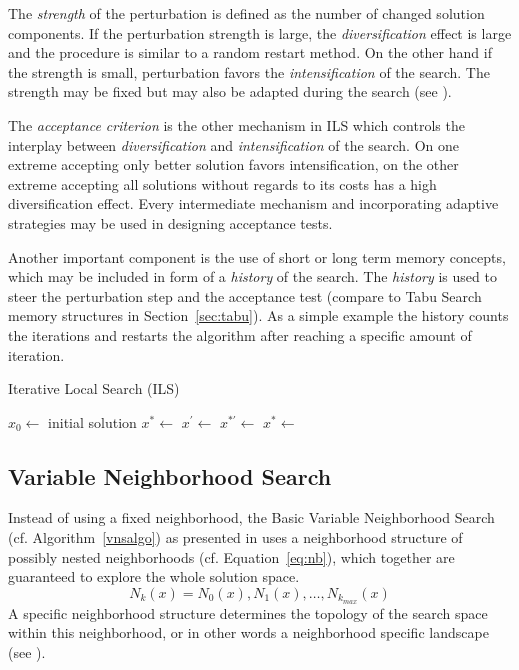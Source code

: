 The \emph{strength} of the perturbation is defined as the number of changed solution components. 
If the perturbation strength is large, the \emph{diversification} effect is large and the procedure is similar to a random restart method. On the other hand if the strength is small, perturbation favors the \emph{intensification} of the search. The strength may be fixed but may also be adapted during the search (see \cite{lourencco2001iterated}).

The \emph{acceptance criterion} is the other mechanism in ILS which controls the interplay between \emph{diversification} and \emph{intensification} of the search. 
On one extreme accepting only better solution favors intensification, on the other extreme accepting all solutions without regards to its costs has a high diversification effect. Every intermediate mechanism and incorporating adaptive strategies may be used in designing acceptance tests.  

Another important component is the use of short or long term memory concepts, which may be included in form of a \emph{history} of the search. The \emph{history} is used to steer the perturbation step and the acceptance test (compare to Tabu Search memory structures in Section~\ref{sec:tabu}). As a simple example the history counts the iterations and restarts the algorithm after reaching a specific amount of iteration.
 
\begin{algorithm}
\caption{Iterative Local Search (ILS)}
\label{ilsalgo}
\begin{algorithmic}[1]
\State $x_0\gets$ initial solution
\State $x^*\gets$ 
\Repeat
\State $x^\prime \gets$ 
\State $x^{*\prime} \gets$ 
\State $x^* \gets$ 
\end{algorithmic}
\end{algorithm}

\subsection{Variable Neighborhood Search}\label{sec:vns}
Instead of using a fixed neighborhood, the Basic Variable Neighborhood Search (cf. Algorithm~\ref{vnsalgo}) as presented in \cite{VNS} uses a neighborhood structure of possibly nested neighborhoods (cf. Equation~\ref{eq:nb}), which together are guaranteed to explore the whole solution space. 
\begin{equation}
N_k(x)=N_0(x),N_1(x),\dots,N_{k_{max}}(x)
\label{eq:nb}
\end{equation}
A specific neighborhood structure determines the topology of the search space within this neighborhood, or in other words a neighborhood specific landscape (see \cite{blum2003metaheuristics}).

